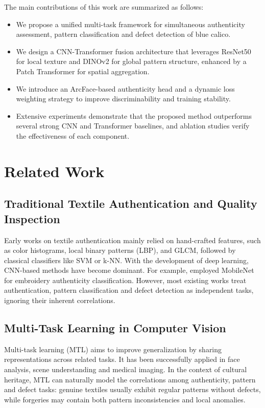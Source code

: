 \documentclass[preprint,12pt,a4paper]{elsarticle}
\begin{document}
The main contributions of this work are summarized as follows:
\begin{itemize}
    \item We propose a unified multi-task framework for simultaneous authenticity assessment, pattern classification and defect detection of blue calico.
    \item We design a CNN-Transformer fusion architecture that leverages ResNet50 for local texture and DINOv2 for global pattern structure, enhanced by a Patch Transformer for spatial aggregation.
    \item We introduce an ArcFace-based authenticity head and a dynamic loss weighting strategy to improve discriminability and training stability.
    \item Extensive experiments demonstrate that the proposed method outperforms several strong CNN and Transformer baselines, and ablation studies verify the effectiveness of each component.
\end{itemize}

\section{Related Work}\label{sec:related}

\subsection{Traditional Textile Authentication and Quality Inspection}

Early works on textile authentication mainly relied on hand-crafted features, such as color histograms, local binary patterns (LBP), and GLCM, followed by classical classifiers like SVM or k-NN.
With the development of deep learning, CNN-based methods have become dominant.
For example, \citet{sample-ref} employed MobileNet for embroidery authenticity classification.
However, most existing works treat authentication, pattern classification and defect detection as independent tasks, ignoring their inherent correlations.

\subsection{Multi-Task Learning in Computer Vision}

Multi-task learning (MTL) aims to improve generalization by sharing representations across related tasks.
It has been successfully applied in face analysis, scene understanding and medical imaging.
In the context of cultural heritage, MTL can naturally model the correlations among authenticity, pattern and defect tasks: genuine textiles usually exhibit regular patterns without defects, while forgeries may contain both pattern inconsistencies and local anomalies.
\end{document}
